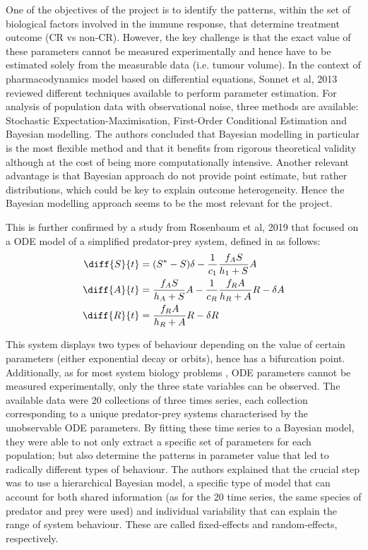 \documentclass[11pt]{article}
\begin{document}
One of the objectives of the project is to identify the patterns, within the set of biological factors involved in the immune response, that determine treatment outcome (CR vs non-CR). However, the key challenge is that the exact value of these parameters cannot be measured experimentally and hence have to be estimated solely from the measurable data (i.e. tumour volume). In the context of pharmacodynamics model based on differential equations, Sonnet et al, 2013 \cite{revParamEst} reviewed different techniques available to perform parameter estimation. For analysis of population data with observational noise, three methods are available: Stochastic Expectation-Maximisation, First-Order Conditional Estimation and Bayesian modelling. The authors concluded that Bayesian modelling in particular is the most flexible method and that it benefits from rigorous theoretical validity although at the cost of being more computationally intensive. Another relevant advantage is that Bayesian approach do not provide point estimate, but rather distributions, which could be key to explain outcome heterogeneity. Hence the Bayesian modelling approach seems to be the most relevant for the project. 

This is further confirmed by a study from Rosenbaum et al, 2019 \cite{rosenbaum} that focused on a ODE model of a simplified predator-prey system, defined in \cite{fussmann} as follows:
\begin{align*}
    \diff{S}{t}&=(S^*-S)\delta - \frac{1}{c_1}\frac{f_A S}{h_1+S}A \\ 
    \diff{A}{t}&=\frac{f_AS}{h_A+S}A-\frac{1}{c_R}\frac{f_RA}{h_R+A}R-\delta A\\
    \diff{R}{t}&=\frac{f_RA}{h_R+A}R-\delta R
\end{align*}

This system displays two types of behaviour depending on the value of certain parameters (either exponential decay or orbits), hence has a bifurcation point. Additionally, as for most system biology problems \cite{mcmcPE}, ODE parameters cannot be measured experimentally, only the three state variables can be observed. The available data were 20 collections of three times series, each collection corresponding to a unique predator-prey systems characterised by the unobservable ODE parameters. By fitting these time series to a Bayesian model, they were able to not only extract a specific set of parameters for each population; but also determine the patterns in parameter value that led to radically different types of behaviour. The authors explained that the crucial step was to use a hierarchical Bayesian model, a specific type of model that can account for both shared information (as for the 20 time series, the same species of predator and prey were used) and individual variability that can explain the range of system behaviour. These are called fixed-effects and random-effects, respectively.
\end{document}
